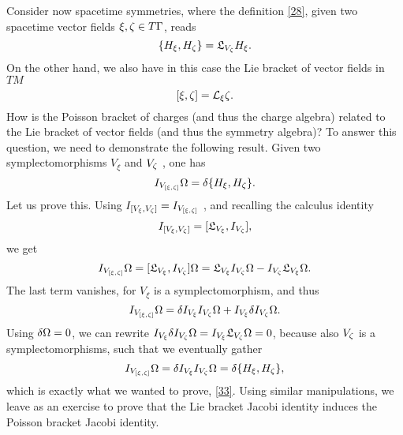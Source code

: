  Consider now spacetime symmetries, where the definition \eqref{28}, given two spacetime vector fields $\xi, \zeta  \in T\Gamma $, reads
 \begin{equation}\label{31}
 	\{H_\xi,H_\zeta \}=\mathfrak{L}_{V_\zeta  }H_\xi .
 \end{equation}
 On the other hand, we also have in this case the Lie bracket of vector fields in $TM$
 \begin{equation}\label{32}
 	[\xi,\zeta ]=\mathcal{L}_\xi \zeta .
 \end{equation}
 How is the Poisson bracket of charges (and thus the charge algebra) related to the Lie bracket of vector fields (and thus the symmetry algebra)? To answer this question, we need to demonstrate the following result. Given two symplectomorphisms $V_\xi $ and $V_\zeta $ , one has
 \begin{equation}\label{33}
 	I_{V_{[\xi ,\zeta ]}}\Omega=\delta \{H_\xi ,H_\zeta \}.
 \end{equation}
 Let us prove this. Using $I_{[V_\xi ,V_\zeta ]}=I_{V_{[\xi,\zeta ]}}$ , and recalling the calculus identity
 \begin{equation}\label{34}
 	I_{[V_\xi ,V_\zeta ]}=[\mathfrak{L}_{V_\xi },I_{V_\zeta }],
 \end{equation}
 we get
 \begin{equation}\label{35}
 	I_{V_{[\xi,\zeta ]}}\Omega=[\mathfrak{L}_{V_\xi },I_{V_\zeta }]\Omega=\mathfrak{L}_{V_\xi }I_{V_\zeta }\Omega-I_{V_\zeta }\mathfrak{L}_{V_\xi }\Omega.
 \end{equation}
 The last term vanishes, for $V_\xi $ is a symplectomorphism, and thus
 \begin{equation}\label{36}
 	I_{V_{[\xi,\zeta ]}}\Omega=\delta I_{V_\xi }I_{V_\zeta }\Omega+I_{V_\xi }\delta I_{V_\zeta }\Omega.
 \end{equation}
 Using $\delta\Omega=0$, we can rewrite $I_{V_\xi }\delta I_{V_\zeta }\Omega=I_{V_\xi }\mathfrak{L}_{V_\zeta }\Omega=0$, because also $V_\zeta $ is a symplectomorphisms, such that we eventually gather
\begin{equation}\label{37}
	I_{V_{[\xi,\zeta ]}}\Omega=\delta I_{V_\xi }I_{V_\zeta }\Omega=\delta \{H_\xi,H_\zeta \},
\end{equation}
which is exactly what we wanted to prove, \eqref{33}. Using similar manipulations, we leave as an exercise to prove that the Lie bracket Jacobi identity induces the Poisson bracket Jacobi identity.

